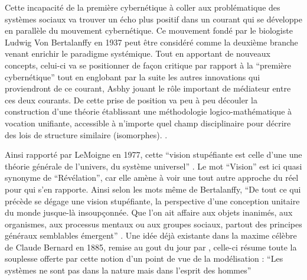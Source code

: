 Cette incapacité de la première cybernétique à coller aux problématique des systèmes sociaux va trouver un écho plus positif dans un courant qui se développe en parallèle du mouvement cybernétique. Ce mouvement fondé par le biologiste Ludwig Von Bertalanffy en 1937 peut être considéré comme la deuxième branche venant enrichir le paradigme systémique. Tout en apportant de nouveaux concepts, celui-ci va se positionner de façon critique par rapport à la \enquote{première cybernétique} tout en englobant par la suite les autres innovations qui proviendront de ce courant, Asbhy jouant le rôle important de médiateur entre ces deux courants.\autocite[]{Pouvreau2013} De cette prise de position va peu à peu découler la construction d'une théorie établissant une méthodologie logico-mathématique à vocation unifiante, accessible à n'importe quel champ disciplinaire pour décrire des lois de structure similaire (isomorphes). \autocite{LeMoigne2006a}.

Ainsi rapporté par LeMoigne en 1977, cette \enquote{vision stupéfiante est celle d'une une théorie générale de l'univers, du système universel} \autocite[59]{Lemoigne1977}. Le mot \enquote{Vision} est ici quasi synonyme de \enquote{Révélation}, car elle amène à voir une tout autre approche du réel pour qui s'en rapporte. Ainsi selon les mots même de Bertalanffy, \enquote{De tout ce qui précède se dégage une vision stupéfiante, la perspective d'une conception unitaire du monde jusque-là insoupçonnée. Que l'on ait affaire aux objets inanimés, aux organismes, aux processus mentaux ou aux groupes sociaux, partout des principes généraux semblables émergent} \autocite[59]{Lemoigne1977} \autocite[220]{Bertalanffy1949}. Une idée déjà existante dans la maxime célèbre de Claude Bernard en 1885, remise au gout du jour par \autocite{Lemoigne1977}, celle-ci résume toute la souplesse offerte par cette notion d'un point de vue de la modélisation :  \enquote{Les systèmes ne sont pas dans la nature mais dans l'esprit des hommes}

